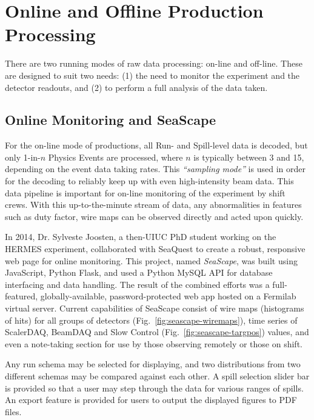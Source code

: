 
\section{Online and Offline Production Processing}

There are two running modes of raw data processing: on-line and off-line. These are designed to suit two needs: (1) the need to monitor the experiment and the detector readouts, and (2) to perform a full analysis of the data taken.

\subsection{Online Monitoring and SeaScape}

For the on-line mode of productions, all Run- and Spill-level data is decoded, but only 1-in-$n$ Physics Events are processed, where $n$ is typically between 3 and 15, depending on the event data taking rates. This \emph{``sampling mode''} is used in order for the decoding to reliably keep up with even high-intensity beam data. This data pipeline is important for on-line monitoring of the experiment by shift crews. With this up-to-the-minute stream of data, any abnormalities in features such as duty factor, wire maps can be observed directly and acted upon quickly.

In 2014, Dr. Sylveste Joosten, a then-UIUC PhD student working on the HERMES experiment, collaborated with SeaQuest to create a robust, responsive web page for online monitoring. This project, named \emph{SeaScape}, was built using JavaScript, Python Flask, and used a Python MySQL API for database interfacing and data handling. The result of the combined efforts was a full-featured, globally-available, password-protected web app hosted on a Fermilab virtual server. Current capabilities of SeaScape consist of wire maps (histograms of hits) for all groups of detectors (Fig.~\ref{fig:seascape-wiremaps}), time series of ScalerDAQ, BeamDAQ and Slow Control (Fig.~\ref{fig:seascape-targpos}) values, and even a note-taking section for use by those observing remotely or those on shift. 

Any run schema may be selected for displaying, and two distributions from two different schemas may be compared against each other. A spill selection slider bar is provided so that a user may step through the data for various ranges of spills. An export feature is provided for users to output the displayed figures to PDF files.

